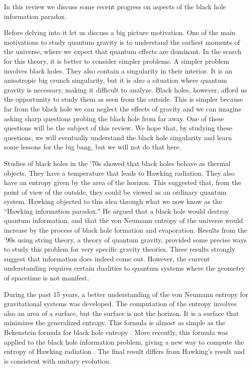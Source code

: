 

 
In this review we discuss some recent progress on aspects of the black hole information paradox. 

Before delving into it let us discuss a big picture motivation. 
One of the main motivations to study quantum gravity is to understand the 
earliest moments of the universe, where we expect that quantum effects are dominant. 
In the search for this theory, it is better to consider simpler problems. A simpler problem involves black holes. They also contain a singularity in  their interior. It is an anisotropic big crunch singularity, but it is also a situation where quantum gravity is necessary, making it difficult to analyze. Black holes, however, afford us the opportunity to study them as seen from the outside. This is simpler because far from the black hole we can neglect the effects of gravity and we can imagine asking sharp questions probing the black hole from far away. One of these questions will be the subject of this review. We hope that, by studying these questions, we will eventually understand the black hole singularity and learn some lessons for the big bang, but we will not do that here. 

Studies of black holes in the '70s showed that black holes behave as thermal objects. They have a temperature that leads to Hawking radiation. They also have an entropy given by the area of the horizon. This suggested that, from the point of view of the outside, they could be viewed as an ordinary quantum system.   
Hawking objected to this idea through what we now know as the ``Hawking information paradox." He argued that a black hole would destroy quantum information, and that the von Neumann entropy of the universe would increase by the process of black hole formation and evaporation. 
 Results from the '90s using string theory, a theory of quantum gravity, provided some precise ways to study this problem for very specific gravity theories. These results strongly suggest that information does indeed come out. However, the current understanding requires certain dualities to quantum systems  where the geometry of spacetime is not manifest. 
 
 During the past 15 years, a better understanding of the von Neumann entropy for gravitational systems was developed.   The computation of the entropy involves also an area of a surface, but the surface is not the horizon. It is a surface that minimizes the generalized entropy. This formula is almost as simple as the Bekenstein formula for black hole entropy \cite{Bekenstein:1972tm,Bekenstein:1973ur}. 
  More recently, this formula was applied to the black hole information problem, giving a new way to compute the entropy of Hawking radiation \cite{Penington:2019npb,Almheiri:2019psf}. The final result differs from Hawking's result and is consistent with unitary evolution.  


